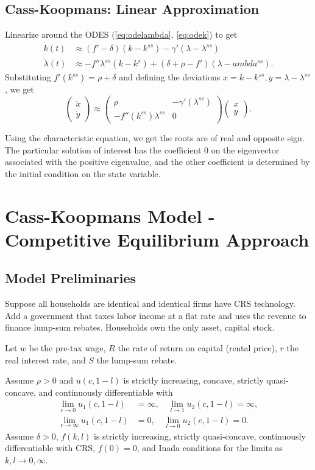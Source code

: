 \documentclass{tufte-handout}
\theoremstyle{definition}
\begin{document}
\subsection{Cass-Koopmans: Linear Approximation}
Linearize around the ODES (\ref{eq:odelambda}, \ref{eq:odek}) to get
\begin{align*}
	\dot{k}(t) &\approx \left( f' -\delta \right)(k-k^{ss}) - \gamma'(\lambda-\lambda^{ss}) \\
	\dot{\lambda}(t) &\approx -f''\lambda^{ss}(k-k^{s}) + \left( \delta + \rho - f' \right)(\lambda - ambda^{ss})
.\end{align*}
Substituting $f'(k^{ss}) = \rho + \delta$ and defining the deviations $x = k-k^{ss}, y = \lambda - \lambda^{ss}$, we get \[
	\begin{pmatrix}
	\dot{x} \\
	\dot{y}
	\end{pmatrix} \approx \begin{pmatrix}
	\rho & - \gamma'(\lambda^{ss}) \\
	-f''(k^{ss})\lambda^{ss} & 0
	\end{pmatrix} \begin{pmatrix}
	x  \\
	y
	\end{pmatrix} 
.\] 

Using the characteristic equation, we get the roots are of real and opposite sign. The particular solution of interest has the coefficient $0$ on the eigenvector associated with the positive eigenvalue, and the other coefficient is determined by the initial condition on the state variable. 

\section{Cass-Koopmans Model - Competitive Equilibrium Approach}
\subsection{Model Preliminaries}
Suppose all households are identical and identical firms have CRS technology. Add a government that taxes labor income at a flat rate and uses the revenue to finance lump-sum rebates. Households own the only asset, capital stock.

Let $w$ be the pre-tax wage, $R$ the rate of return on capital (rental price), $r$ the real interest rate, and $S$ the lump-sum rebate.

Assume $\rho > 0$ and $u(c,1-l)$ is strictly increasing, concave, strictly quasi-concave, and continuously differentiable with
\begin{align*}
	\lim\limits_{c \to 0} u_1(c,1-l) &= \infty, \quad \lim\limits_{l \to 1} u_2(c,1-l) = \infty, \\
	\lim\limits_{c \to \infty} u_1(c,1-l) &= 0, \quad \lim\limits_{l \to 0} u_2(c,1-l) = 0
.\end{align*}
Assume $\delta > 0$, $f(k,l)$ is strictly increasing, strictly quasi-concave, continuously differentiable with CRS, $f(0) = 0$, and Inada conditions for the limits as $k, l \to 0, \infty$.
\end{document}
